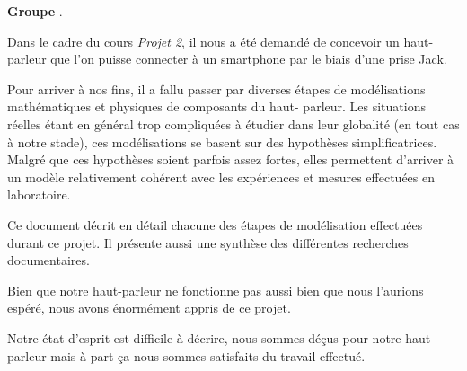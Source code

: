 

\textbf{Groupe }.

\begin{abstract-fr}
Dans le cadre du cours \textit{Projet 2}, il nous a été demandé
de concevoir un haut-parleur que l'on puisse connecter à un smartphone
par le biais d'une prise Jack.

Pour arriver à nos fins, il a fallu passer par diverses étapes
de modélisations mathématiques et physiques de composants du haut-
parleur. Les situations réelles étant en général trop compliquées à étudier
dans leur globalité (en tout cas à notre stade), ces modélisations se basent sur des 
hypothèses simplificatrices. Malgré que ces hypothèses soient parfois assez fortes, 
elles permettent d'arriver à un modèle relativement cohérent avec les expériences et
mesures effectuées en laboratoire.

Ce document décrit en détail chacune des étapes de modélisation effectuées durant
ce projet. Il présente aussi une synthèse des différentes recherches documentaires.

Bien que notre haut-parleur ne fonctionne pas aussi bien que nous l'aurions
espéré, nous avons énormément appris de ce projet.

Notre état d'esprit est difficile à décrire, nous sommes déçus pour notre haut-parleur
mais à part ça nous sommes satisfaits du travail effectué.


\end{abstract-fr}
